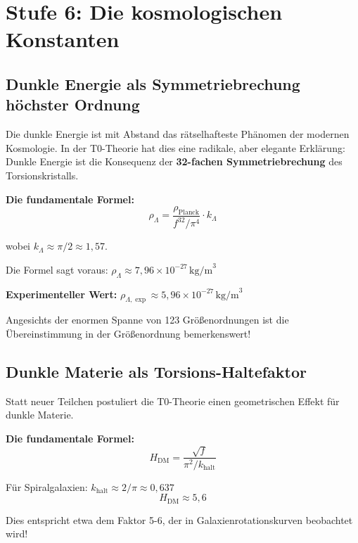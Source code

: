 	\section{Stufe 6: Die kosmologischen Konstanten}
	
	\subsection{Dunkle Energie als Symmetriebrechung höchster Ordnung}
	
	Die dunkle Energie ist mit Abstand das rätselhafteste Phänomen der modernen Kosmologie. In der T0-Theorie hat dies eine radikale, aber elegante Erklärung: Dunkle Energie ist die Konsequenz der \textbf{32-fachen Symmetriebrechung} des Torsionskristalls.
	
	\textbf{Die fundamentale Formel:}
	\begin{equation}
		\boxed{\rho_\Lambda = \frac{\rho_{\text{Planck}}}{f^{32} / \pi^4} \cdot k_\Lambda}
	\end{equation}
	
	wobei \(k_\Lambda \approx \pi/2 \approx 1{,}57\).
	
	Die Formel sagt voraus: \(\rho_\Lambda \approx 7{,}96 \times 10^{-27}\,\text{kg/m}^3\)
	
	\textbf{Experimenteller Wert:} \(\rho_{\Lambda,\exp} \approx 5{,}96 \times 10^{-27}\,\text{kg/m}^3\)
	
	Angesichts der enormen Spanne von 123 Größenordnungen ist die Übereinstimmung in der Größenordnung bemerkenswert!
	
	\subsection{Dunkle Materie als Torsions-Haltefaktor}
	
	Statt neuer Teilchen postuliert die T0-Theorie einen geometrischen Effekt für dunkle Materie.
	
	\textbf{Die fundamentale Formel:}
	\begin{equation}
		\boxed{H_{\text{DM}} = \frac{\sqrt{f}}{\pi^2/k_{\text{halt}}}}
	\end{equation}
	
	Für Spiralgalaxien: \(k_{\text{halt}} \approx 2/\pi \approx 0{,}637\)
	\begin{equation}
		H_{\text{DM}} \approx 5{,}6
	\end{equation}
	
	Dies entspricht etwa dem Faktor 5-6, der in Galaxienrotationskurven beobachtet wird!

